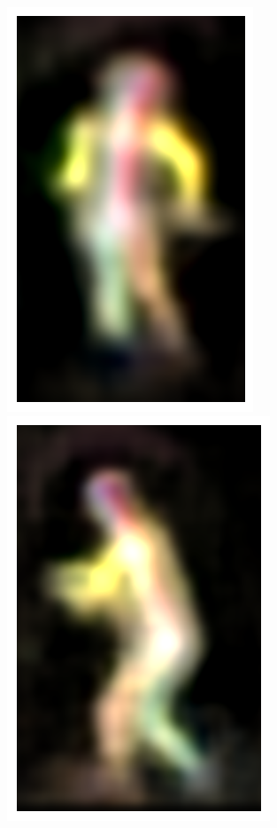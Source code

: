\begin{figure}[t!]
    \includegraphics[height=\flowhh]{resources/Human_Poses/qualitative/svs-8}
    \hfill
    \includegraphics[height=\flowhh]{resources/Human_Poses/qualitative/svs-10}
    \hfill

\end{figure}
